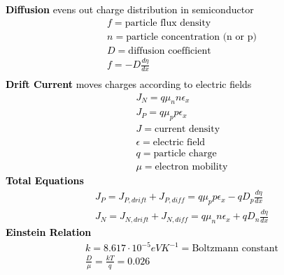 \documentclass[a4paper,8pt]{extarticle} %
\newcommand{\mybox}[2]{
    \begin{tcolorbox}[colback=lightblue!5!white,colframe=lightblue!75!black,boxsep=1pt,arc=0pt,outer arc=0pt,title={\textcolor{black}{#1}}]
        \textcolor{black}{#2}
    \end{tcolorbox}
}
\begin{document}
\begin{multicols}{2}
\mybox{Currents in Semiconductors}{
\textbf{Diffusion} evens out charge distribution in semiconductor
\begin{subequations}
\begin{align}
    f = \text{particle flux density} \\
    n = \text{particle concentration (n or p)} \\
    D = \text{diffusion coefficient} \\
    f = -D \frac{d\eta}{dx} \\
\end{align}
\end{subequations}
\textbf{Drift Current} moves charges according to electric fields
\begin{subequations}
\begin{align}
    J_N = q\mu_nn\epsilon_x \\
    J_P = q\mu_pp\epsilon_x \\
    J = \text{current density} \\
    \epsilon = \text{electric field} \\
    q = \text{particle charge} \\
    \mu = \text{electron mobility}
\end{align}
\end{subequations}
\textbf{Total Equations}
\begin{subequations}
\begin{align}
    J_P = J_{P, drift} + J_{P, diff} = q\mu_pp\epsilon_x - qD_p \frac{d\eta}{dx} \\ 
    J_N = J_{N, drift} + J_{N, diff} = q\mu_nn\epsilon_x + qD_n \frac{d\eta}{dx}
\end{align}
\end{subequations}
\textbf{Einstein Relation}
\begin{subequations}
\begin{align}
    k = 8.617 \cdot 10^{-5} eV K^{-1} = \text{Boltzmann constant} \\
    \frac{D}{\mu} = \frac{kT}{q} = 0.026 
\end{align}
\end{subequations}
}


\end{multicols}
\end{document}
